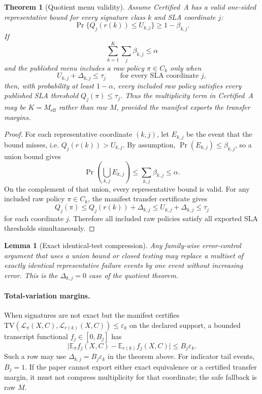 \documentclass[11pt]{article}
\newtheorem{theorem}{Theorem}
\newtheorem{lemma}{Lemma}
\begin{document}
\begin{theorem}[Quotient menu validity]
Assume Certified~A has a valid one-sided representative bound for every signature class $k$ and SLA coordinate $j$:
\[
\Pr\{Q_j(r(k))\le U_{k,j}\}\ge 1-\beta_{k,j}.
\]
If
\[
\sum_{k=1}^K\sum_j \beta_{k,j}\le \alpha
\]
and the published menu includes a raw policy $\pi\in C_k$ only when
\[
U_{k,j}+\Delta_{k,j}\le \tau_j\qquad\text{for every SLA coordinate }j,
\]
then, with probability at least $1-\alpha$, every included raw policy satisfies every published SLA threshold $Q_j(\pi)\le \tau_j$.
Thus the multiplicity term in Certified~A may be $K=M_{\mathrm{eff}}$ rather than raw $M$, provided the manifest exports the transfer margins.
\end{theorem}

\begin{proof}
For each representative coordinate $(k,j)$, let $E_{k,j}$ be the event that the bound misses, i.e. $Q_j(r(k))>U_{k,j}$.
By assumption, $\Pr(E_{k,j})\le\beta_{k,j}$, so a union bound gives
\[
\Pr\left(\bigcup_{k,j}E_{k,j}\right)\le \sum_{k,j}\beta_{k,j}\le\alpha .
\]
On the complement of that union, every representative bound is valid.
For any included raw policy $\pi\in C_k$, the manifest transfer certificate gives
\[
Q_j(\pi)\le Q_j(r(k))+\Delta_{k,j}\le U_{k,j}+\Delta_{k,j}\le \tau_j
\]
for each coordinate $j$.
Therefore all included raw policies satisfy all exported SLA thresholds simultaneously.
\end{proof}

\begin{lemma}[Exact identical-test compression]
Any family-wise error-control argument that uses a union bound or closed testing may replace a multiset of exactly identical representative failure events by one event without increasing error.
This is the $\Delta_{k,j}=0$ case of the quotient theorem.
\end{lemma}

\paragraph{Total-variation margins.}
When signatures are not exact but the manifest certifies
$\mathrm{TV}(\mathcal L_\pi(X,C),\mathcal L_{r(k)}(X,C))\le\varepsilon_{k}$
on the declared support, a bounded transcript functional $f_j\in[0,B_j]$ has
\[
\big|\mathbb E_\pi f_j(X,C)-\mathbb E_{r(k)} f_j(X,C)\big|\le B_j\varepsilon_k.
\]
Such a row may use $\Delta_{k,j}=B_j\varepsilon_k$ in the theorem above.
For indicator tail events, $B_j=1$.
If the paper cannot export either exact equivalence or a certified transfer margin, it must not compress multiplicity for that coordinate; the safe fallback is raw $M$.
\end{document}
